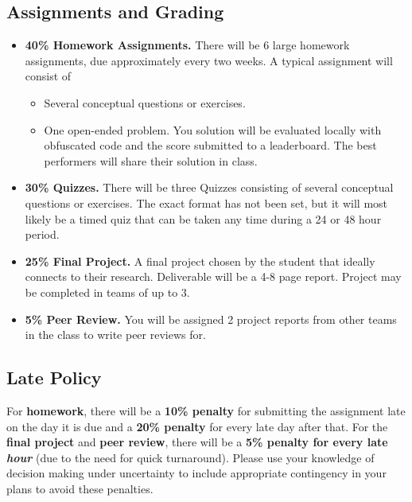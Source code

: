 \documentclass[9pt]{article}
\begin{document}
\begin{samepage}
\section*{Assignments and Grading}

\begin{itemize}[nosep]
    \item \textbf{40\% Homework Assignments.}
There will be 6 large homework assignments, due approximately every two weeks. A typical assignment will consist of
\begin{itemize}[nosep]
    \item Several conceptual questions or exercises.
    \item One open-ended problem. You solution will be evaluated locally with obfuscated code and the score submitted to a leaderboard. The best performers will share their solution in class.
\end{itemize}

\item \textbf{30\% Quizzes.}
There will be three Quizzes consisting of several conceptual questions or exercises. The exact format has not been set, but it will most likely be a timed quiz that can be taken any time during a 24 or 48 hour period.

\item \textbf{25\% Final Project.}
A final project chosen by the student that ideally connects to their research. Deliverable will be a 4-8 page report. Project may be completed in teams of up to 3.

\item \textbf{5\% Peer Review.}
You will be assigned 2 project reports from other teams in the class to write peer reviews for.
\end{itemize}
\end{samepage}

\subsection*{Late Policy}

For \textbf{homework}, there will be a \textbf{10\% penalty} for submitting the assignment late on the day it is due and a \textbf{20\% penalty} for every late day after that. For the \textbf{final project} and \textbf{peer review}, there will be a \textbf{5\% penalty for every late \emph{hour}} (due to the need for quick turnaround). Please use your knowledge of decision making under uncertainty to include appropriate contingency in your plans to avoid these penalties.
\end{document}
